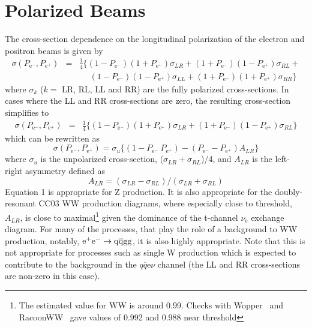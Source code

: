 \documentclass[12pt]{article}
\begin{document}
\section*{Polarized Beams}
The cross-section dependence on the longitudinal polarization of the 
electron and positron beams is given by~\cite{MoortgatPick:2005cw} 
\begin{eqnarray*}
\sigma(P_{\mathrm{e^-}}, P_{\mathrm{e^+}}) & = &  \frac{1}{4} \{ 
(1-P_{\mathrm{e^-}}) (1+P_{\mathrm{e^+}}) \sigma_{LR} +
(1+P_{\mathrm{e^-}}) (1-P_{\mathrm{e^+}}) \sigma_{RL} + \\  
 & & \quad \; (1-P_{\mathrm{e^-}}) (1-P_{\mathrm{e^+}}) \sigma_{LL} +
(1+P_{\mathrm{e^-}}) (1+P_{\mathrm{e^+}}) \sigma_{RR}  
\}
\end{eqnarray*}
where $\sigma_{k}$ ($k=$ LR, RL, LL and RR)  are the fully polarized cross-sections.
In cases where the LL and RR cross-sections are zero, the resulting cross-section simplifies to
\begin{eqnarray*}
\sigma(P_{\mathrm{e^-}}, P_{\mathrm{e^+}}) & = &  \frac{1}{4} \{ 
(1-P_{\mathrm{e^-}}) (1+P_{\mathrm{e^+}}) \sigma_{LR} +
(1+P_{\mathrm{e^-}}) (1-P_{\mathrm{e^+}}) \sigma_{RL}
\}
\end{eqnarray*}
which can be rewritten as 
\begin{equation}
\sigma(P_{\mathrm{e^-}}, P_{\mathrm{e^+}}) = \sigma_u \{ (1 - P_{\mathrm{e^-}} \: P_{\mathrm{e^+}} ) - 
(P_{\mathrm{e^-}} - P_{\mathrm{e^+}}) A_{LR} \}
\end{equation}
where $\sigma_u$ is the unpolarized cross-section, ($\sigma_{LR}+\sigma_{RL}$)/4, and $A_{LR}$ is the left-right asymmetry defined as 
\[  A_{LR} = (\sigma_{LR} - \sigma_{RL}) / (\sigma_{LR} + \sigma_{RL})   \]
Equation 1 is appropriate for Z production. It is also appropriate for 
the doubly-resonant CC03 WW production diagrams, where especially close to threshold, $A_{LR}$, is close to maximal\footnote{The estimated 
value for WW is around 0.99. Checks with Wopper~\cite{Wopper} and RacoonWW~\cite{Racoon} gave values of 0.992 and 0.988 near threshold} 
given the dominance of the t-channel $\nu_{\mathrm{e}}$ exchange diagram.
For many of the processes, that play the role of a background to WW production, notably, $\rm{e}^+\rm{e}^- \rightarrow q \overline{q} g g$, it 
is also highly appropriate. Note that this is not appropriate for processes such 
as single W production which is expected to contribute 
to the background in the $q \overline{q} \mathrm{e} \nu$ channel (the LL and RR cross-sections are non-zero in this case).
\end{document}
